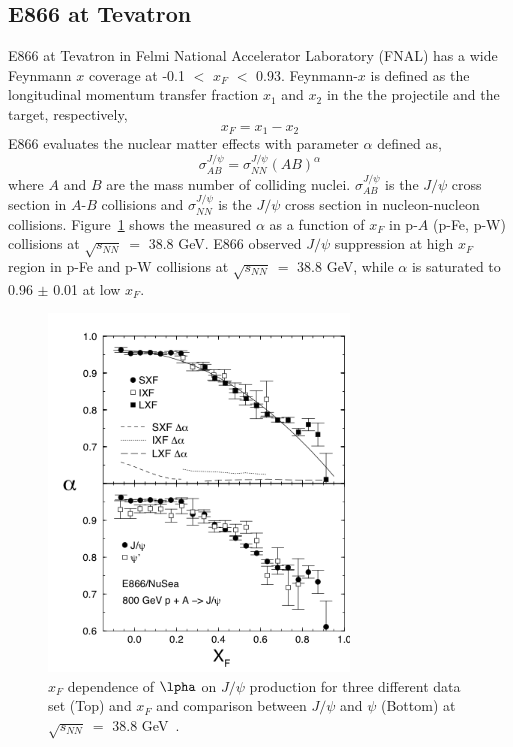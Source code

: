 \subsection{E866 at Tevatron}
E866 at Tevatron in Felmi National Accelerator Laboratory (FNAL) has a wide Feynmann $x$ coverage at -0.1 $<$ $x_{F}$ $<$ 0.93. 
Feynmann-$x$ is defined as the longitudinal momentum transfer fraction $x_{1}$ and $x_{2}$ in the the projectile and the target, respectively, 
\begin{equation}
  x_{F}  = x_{1}-x_{2}
\end{equation}
E866 evaluates the nuclear matter effects with parameter $\alpha$ defined as, 
\begin{equation}
  \sigma^{J/\psi}_{AB} = \sigma^{J/\psi}_{NN}(AB)^{\alpha}
\end{equation}
where $A$ and $B$ are the mass number of colliding nuclei. 
$\sigma^{J/\psi}_{AB}$ is the $J/\psi$ cross section in $A$-$B$ collisions and $\sigma^{J/\psi}_{NN}$ is the $J/\psi$ cross section in nucleon-nucleon collisions. 
Figure~\ref{fig_2_e866} shows the measured $\alpha$ as a function of $x_{F}$ in p-$A$ (p-Fe, p-W) collisions at $\sqrt{s_{NN}}~=$ 38.8 GeV. 
E866 observed $J/\psi$ suppression at high $x_{F}$ region in p-Fe and p-W collisions at $\sqrt{s_{NN}}~=$ 38.8 GeV, while  $\alpha $ is saturated to 0.96 $\pm$ 0.01 at low $x_{F}$. 
\begin{figure}
  \centering
  \includegraphics[width=8cm]{chap2/figure/experimentaldata/e866_xf.png}
  \caption{ $x_{F}$ dependence of $\lpha$ on $J/\psi$ production for three different data set (Top) and  $x_{F}$ and comparison between $J/\psi$ and $\psi$ (Bottom) at $\sqrt{s_{NN}}~ =$ 38.8 GeV~\cite{bib_e866}. }
  \label{fig_2_e866}
\end{figure}

